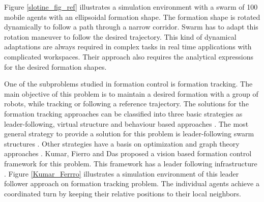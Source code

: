 Figure \ref{slotine_fig_ref} illustrates a simulation environment with a swarm of 100 mobile agents with an ellipsoidal formation shape. The formation shape is rotated dynamically to follow a path through a narrow corridor. Swarm has to adapt this  rotation maneuver to follow the desired trajectory. This kind of dynamical adaptations are always required in complex tasks in real time applications with complicated workspaces. Their approach also requires the analytical expressions for the desired formation shapes.

One of the subproblems studied in formation control is formation tracking. The main objective of this problem is to maintain a desired formation with a group of robots, while tracking or following a reference trajectory. The solutions for the formation tracking approaches can be classified into three basic strategies as leader-following, virtual structure and behaviour based approaches \cite{12}. The most general strategy to provide a solution for this problem is leader-following swarm structures \cite{18}. Other strategies have a basis on optimization and graph theory approaches \cite{12}. Kumar, Fierro and Das proposed a vision based formation control framework  for this problem. This framework has a leader following infrastructure \cite{18}. Figure \ref{Kumar_Ferrro} illustrates a simulation environment of this leader follower approach on formation tracking problem. The individual agents achieve a coordinated turn by keeping their relative positions to their local neighbors. 

